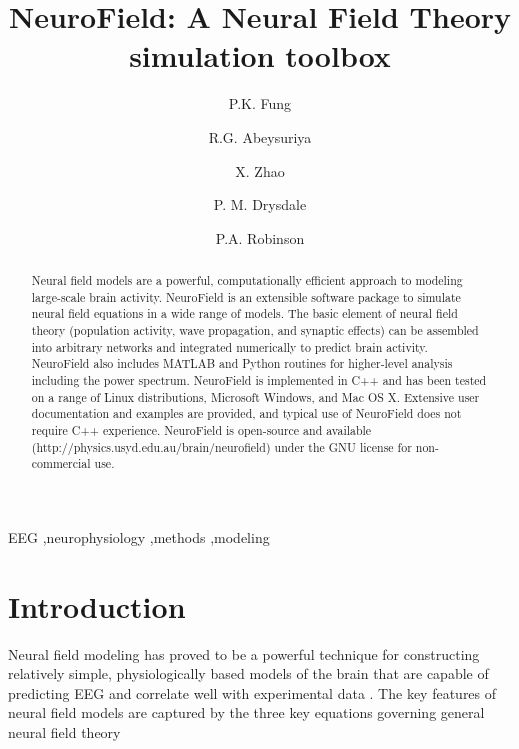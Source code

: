 \documentclass[preprint,review,10pt,authoryear,letterpaper]{elsarticle}
\begin{document}
\begin{frontmatter}

\title{NeuroField: A Neural Field Theory simulation toolbox}


\author{P.K. Fung}
\author{R.G. Abeysuriya\corref{}}
\author{X. Zhao\corref{}}
\author{P. M. Drysdale\corref{}}

\author{P.A. Robinson\corref{}}

\address{School of Physics, University of Sydney, New South Wales, Australia}


\begin{abstract}
Neural field models are a powerful, computationally efficient approach to modeling large-scale brain activity. NeuroField is an extensible software package to simulate neural field equations in a wide range of models. The basic element of neural field theory (population activity, wave propagation, and synaptic effects) can be assembled into arbitrary networks and integrated numerically to predict brain activity. NeuroField also includes MATLAB and Python routines for higher-level analysis including the power spectrum. NeuroField is implemented in C++ and has been tested on a range of Linux distributions, Microsoft Windows, and Mac OS X. Extensive user documentation and examples are provided, and typical use of NeuroField does not require C++ experience. NeuroField is open-source and available (http://physics.usyd.edu.au/brain/neurofield) under the GNU license for non-commercial use. 
\end{abstract}

\begin{keyword}
EEG \sep neurophysiology \sep methods \sep modeling

\end{keyword}

\end{frontmatter}

\linenumbers

\section{Introduction}
\label{sec:introduction}
Neural field modeling has proved to be a powerful technique for constructing relatively simple, physiologically based models of the brain that are capable of predicting EEG and correlate well with experimental data \cite{Deco2008,Pinotsis2012}. The key features of neural field models are captured by the three key equations governing general neural field theory
\end{document}
